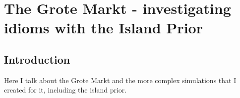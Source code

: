  

\chapter[The Great Grote Markt Robbery Island Prior]{The Grote Markt - investigating idioms with the Island Prior}

\section{Introduction}
Here I talk about the Grote Markt and the more complex simulations that I created for it, including the island prior.